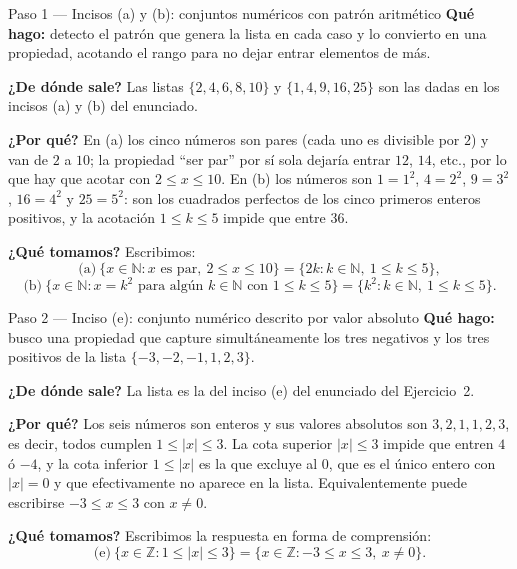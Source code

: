 \documentclass[11pt]{article}
\begin{document}
\begin{paso}{Paso 1 --- Incisos (a) y (b): conjuntos numéricos con patrón aritmético}
\textbf{Qué hago:} detecto el patrón que genera la lista en cada caso y lo convierto en una
propiedad, acotando el rango para no dejar entrar elementos de más.

\textbf{¿De dónde sale?} Las listas $\{2,4,6,8,10\}$ y $\{1,4,9,16,25\}$ son las dadas en los
incisos (a) y (b) del enunciado.

\textbf{¿Por qué?} En (a) los cinco números son pares (cada uno es divisible por $2$) y van de
$2$ a $10$; la propiedad ``ser par'' por sí sola dejaría entrar $12$, $14$, etc., por lo que
hay que acotar con $2\le x\le 10$. En (b) los números son $1=1^{2}$, $4=2^{2}$, $9=3^{2}$,
$16=4^{2}$ y $25=5^{2}$: son los cuadrados perfectos de los cinco primeros enteros positivos,
y la acotación $1\le k\le 5$ impide que entre $36$.

\textbf{¿Qué tomamos?} Escribimos:
\[
\text{(a)}\ \{x\in\mathbb{N}: x \text{ es par},\ 2\le x\le 10\}
=\{2k : k\in\mathbb{N},\ 1\le k\le 5\},
\]
\[
\text{(b)}\ \{x\in\mathbb{N}: x=k^{2} \text{ para algún } k\in\mathbb{N} \text{ con } 1\le k\le 5\}
=\{k^{2} : k\in\mathbb{N},\ 1\le k\le 5\}.
\]
\end{paso}

\begin{paso}{Paso 2 --- Inciso (e): conjunto numérico descrito por valor absoluto}
\textbf{Qué hago:} busco una propiedad que capture simultáneamente los tres negativos y los
tres positivos de la lista $\{-3,-2,-1,1,2,3\}$.

\textbf{¿De dónde sale?} La lista es la del inciso (e) del enunciado del Ejercicio~2.

\textbf{¿Por qué?} Los seis números son enteros y sus valores absolutos son $3,2,1,1,2,3$, es
decir, todos cumplen $1\le|x|\le 3$. La cota superior $|x|\le 3$ impide que entren $4$ ó
$-4$, y la cota inferior $1\le|x|$ es la que excluye al $0$, que es el único entero con
$|x|=0$ y que efectivamente no aparece en la lista. Equivalentemente puede escribirse
$-3\le x\le 3$ con $x\neq 0$.

\textbf{¿Qué tomamos?} Escribimos la respuesta en forma de comprensión:
\[
\text{(e)}\ \{x\in\mathbb{Z}: 1\le |x| \le 3\}=\{x\in\mathbb{Z}: -3\le x\le 3,\ x\neq 0\}.
\]
\end{paso}
\end{document}
